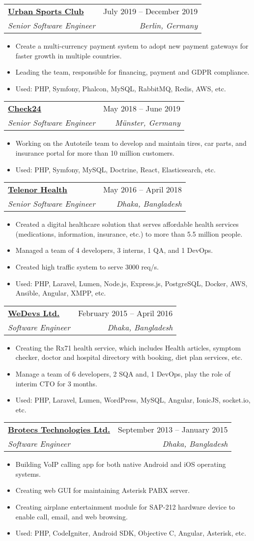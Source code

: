 \documentclass[a4paper,11pt]{article}
\makeatletter
\newcommand{\resumeItem}[1]{
  \item\small{
    {#1 \vspace{-2pt}}
  }
}
\newcommand{\resumeSubheading}[4]{
  \vspace{-2pt}\item
    \begin{tabular*}{0.97\textwidth}[t]{l@{\extracolsep{\fill}}r}
      \textbf{#1} & #2 \\
      \textit{\small#3} & \textit{\small #4} \\
    \end{tabular*}\vspace{-7pt}
}
\newcommand{\resumeItemListStart}{\begin{itemize}}
\newcommand{\resumeItemListEnd}{\end{itemize}\vspace{-5pt}}
\makeatother
\begin{document}
    \resumeSubheading
      {\href{https://urbansportsclub.com}{\underline{Urban Sports Club}}}{July 2019 -- December 2019}
      {Senior Software Engineer}{Berlin, Germany}
      \resumeItemListStart
        \resumeItem{Create a multi-currency payment system to adopt new payment gateways for faster growth in multiple countries.}
        \resumeItem{Leading the team, responsible for financing, payment and GDPR compliance.}
        \resumeItem{Used: PHP, Symfony, Phalcon, MySQL, RabbitMQ, Redis, AWS, etc.}
    \resumeItemListEnd

    \resumeSubheading
      {\href{http://check24.de}{\underline{Check24}}}{May 2018 -- June 2019}
      {Senior Software Engineer}{Münster, Germany}
      \resumeItemListStart
        \resumeItem{Working on the Autoteile team to develop and maintain tires, car parts, and insurance portal for more than 10 million customers.}
        \resumeItem{Used: PHP, Symfony, MySQL, Doctrine, React, Elasticsearch, etc.}
      \resumeItemListEnd
      
    \resumeSubheading
      {\href{https://telenorhealth.com}{\underline{Telenor Health}}}{May 2016 -- April 2018}
      {Senior Software Engineer}{Dhaka, Bangladesh}
      \resumeItemListStart
        \resumeItem{Created a digital healthcare solution that serves affordable health services (medications, information, insurance, etc.) to more than 5.5 million people.}
        \resumeItem{Managed a team of 4 developers, 3 interns, 1 QA, and 1 DevOps.}
        \resumeItem{Created high traffic system to serve 3000 req/s.}
        \resumeItem{Used: PHP, Laravel, Lumen, Node.js, Express.js, PostgreSQL, Docker, AWS, Ansible, Angular, XMPP, etc.}
      \resumeItemListEnd
      
    \resumeSubheading
      {\href{https://wedevs.com}{\underline{WeDevs Ltd.}}}{February 2015 -- April 2016}
      {Software Engineer}{Dhaka, Bangladesh}
      \resumeItemListStart
        \resumeItem{Creating the Rx71 health service, which includes Health articles, symptom checker, doctor and hospital directory with booking, diet plan services, etc.}
        \resumeItem{Manage a team of 6 developers, 2 SQA and, 1 DevOps, play the role of interim CTO for 3 months.}
        \resumeItem{Used: PHP, Laravel, Lumen, WordPress, MySQL, Angular, IonicJS, socket.io, etc.}
      \resumeItemListEnd
      
    \resumeSubheading
      {\href{https://brotecs.com}{\underline{Brotecs Technologies Ltd.}}}{September 2013 -- January 2015}
      {Software Engineer}{Dhaka, Bangladesh}
      \resumeItemListStart
        \resumeItem{Building VoIP calling app for both native Android and iOS operating systems.}
        \resumeItem{Creating web GUI for maintaining Asterisk PABX server.}
        \resumeItem{Creating airplane entertainment module for SAP-212 hardware device to enable call, email, and web browsing.}
        \resumeItem{Used: PHP, CodeIgniter, Android SDK, Objective C, Angular, Asterisk, etc.}
      \resumeItemListEnd
\end{document}
